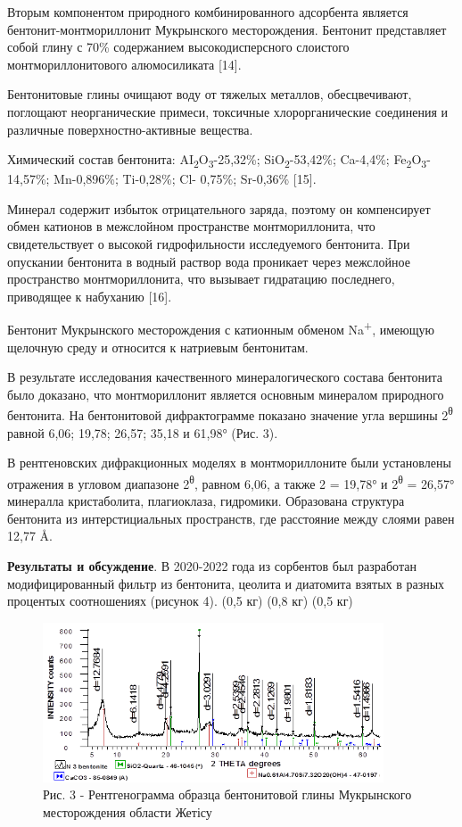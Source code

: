 \begin{multicols}{2}
Вторым компонентом природного комбинированного адсорбента является
бентонит-монтмориллонит Мукрынского месторождения. Бентонит представляет
собой глину с 70\% содержанием высокодисперсного слоистого
монтмориллонитового алюмосиликата {[}14{]}.

Бентонитовые глины очищают воду от тяжелых металлов, обесцвечивают,
поглощают неорганические примеси, токсичные хлорорганические соединения
и различные поверхностно-активные вещества.

Химический состав бентонита:
AI\textsubscript{2}O\textsubscript{3}-25,32\%;
SiO\textsubscript{2}-53,42\%; Ca-4,4\%;
Fe\textsubscript{2}O\textsubscript{3}-14,57\%; Mn-0,896\%; Ti-0,28\%;
Cl- 0,75\%; Sr-0,36\% {[}15{]}.

Минерал содержит избыток отрицательного заряда, поэтому он компенсирует
обмен катионов в межслойном пространстве монтмориллонита, что
свидетельствует о высокой гидрофильности исследуемого бентонита. При
опускании бентонита в водный раствор вода проникает через межслойное
пространство монтмориллонита, что вызывает гидратацию последнего,
приводящее к набуханию {[}16{]}.

Бентонит Мукрынского месторождения с катионным обменом
Na\textsuperscript{+}, имеющую щелочную среду и относится к натриевым
бентонитам.

В результате исследования качественного минералогического состава
бентонита было доказано, что монтмориллонит является основным минералом
природного бентонита. На бентонитовой дифрактограмме показано значение
угла вершины 2\textsuperscript{θ} равной 6,06; 19,78; 26,57; 35,18 и
61,98° (Рис. 3).

В рентгеновских дифракционных моделях в монтмориллоните были установлены
отражения в угловом диапазоне 2\textsuperscript{θ}, равном 6,06, а также
2 = 19,78° и 2\textsuperscript{θ} = 26,57° минералла кристаболита,
плагиоклаза, гидромики. Образована структура бентонита из
интерстициальных пространств, где расстояние между слоями равен 12,77 Å.

{\bfseries Результаты и обсуждение}. В 2020-2022 года из сорбентов был разработан
модифицированный фильтр из бентонита, цеолита и диатомита взятых в
разных процентых соотношениях (рисунок 4). (0,5 кг) (0,8 кг) (0,5 кг)
\end{multicols}

\begin{figure}[H]
	\centering
	\includegraphics[width=0.9\textwidth]{media/chem/image3}
	\caption*{Рис. 3 - Рентгенограмма образца бентонитовой глины Мукрынского
месторождения области Жетісу}
\end{figure}

